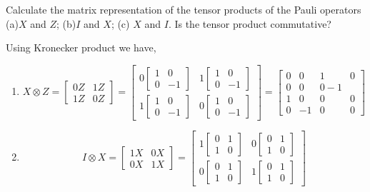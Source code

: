 \begin{example}
    Calculate the matrix representation of the tensor products of the Pauli operators (a)$X$ and $Z$; (b)$I$ and $X$; (c) $X$ and $I$. Is the tensor product commutative?

    Using Kronecker product we have,
    \begin{enumerate}
        \item 
        \[
        X\otimes Z=\begin{bmatrix}
            0Z & 1Z \\ 1Z & 0Z
        \end{bmatrix}= \begin{bmatrix}
            0\begin{bmatrix} 1 & 0 \\ 0 & -1 \end{bmatrix} & 1 \begin{bmatrix} 1 & 0 \\ 0 & -1 \end{bmatrix} \\ 1 \begin{bmatrix} 1 & 0 \\ 0 & -1 \end{bmatrix} & 0 \begin{bmatrix} 1 & 0 \\ 0 & -1 \end{bmatrix}
        \end{bmatrix}=\begin{bmatrix} 0 & 0 & 1 & 0 \\ 0 & 0 & 0 -1 \\ 1 & 0 & 0 & 0 \\ 0 & -1 & 0 & 0 \end{bmatrix}
        \]
        \item
        \[
        I\otimes X=\begin{bmatrix}
            1X & 0X \\ 0X & 1X
        \end{bmatrix}= \begin{bmatrix}
            1\begin{bmatrix} 0 & 1 \\ 1 & 0 \end{bmatrix} & 0 \begin{bmatrix} 0 & 1 \\ 1 & 0 \end{bmatrix} \\ 0 \begin{bmatrix} 0 & 1 \\ 1 & 0 \end{bmatrix} & 1 \begin{bmatrix} 0 & 1 \\ 1 & 0 \end{bmatrix}

\end{bmatrix}\]
\end{enumerate}
\end{example}
